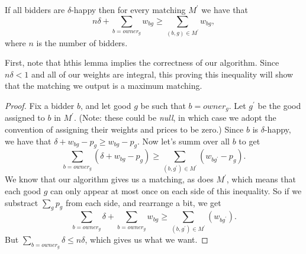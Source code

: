 \documentclass[11pt]{article}
\renewcommand{\'}{^{'}}
\newenvironment{lemma}[2][Lemma]{\begin{trivlist}
\item[\hskip \labelsep {\bfseries #1}\hskip \labelsep {\bfseries #2.}]}{\end{trivlist}}
\begin{document}
\begin{lemma}{}
	If all bidders are $\delta$-happy then for every matching $M\'$ we have that 
	\[
		n\delta + \sum_{b = owner_g} w_{bg} \geq \sum_{(b,g)\in M\'} w_{bg},
	\]
	where $n$ is the number of bidders. 
\end{lemma}

First, note that hthis lemma implies the correctness of our algorithm. Since $n\delta < 1$ and all of 
our weights are integral, this proving this inequality will show that the matching we output is 
a maximum matching.

\begin{proof}
	Fix a bidder $b$, and let good $g$ be such that $b = owner_g$. Let $g\'$ be the good assigned 
	to $b$ in $M\'$. (Note: these could be \emph{null}, in which case we adopt the convention of 
	assigning their weights and prices to be zero.) Since $b$ is $\delta$-happy, we have that 
	$\delta + w_{bg} - p_g \geq w_{bg} - p_g$. Now let's summ over all $b$ to get 
	\[
		\sum_{b=owner_g} (\delta + w_{bg} - p_g) \geq \sum_{(b,g\')\in M\'} (w_{bg\'} - p_g).
	\]
	We know that our algorithm gives us a matching, as does $M\'$, which means that each good $g$ 
	can only appear at most once on each side of this inequality. So if we substract $\sum_g p_g$ 
	from each side, and rearrange a bit, we get 
	\[
		\sum_{b=owner_g} \delta + \sum_{b=owner_g} w_{bg} \geq \sum_{(b,g\')\in M\'} (w_{bg\'}). 
	\]
	But $\sum_{b=owner_g} \delta \leq n\delta$, which gives us what we want.
\end{proof}
\end{document}

